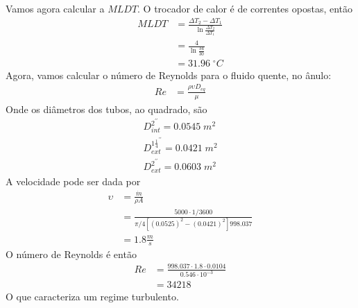 Vamos agora calcular a \(MLDT\). O trocador de calor é de correntes opostas, então
\begin{align}
    MLDT &= \frac{\Delta T_2 - \Delta T_1}{\ln \frac{\Delta T_2}{\Delta T_1}} \\  
    &= \frac{4}{\ln \frac{34}{30}}\\
    &= 31.96 \; ^{\circ}C
\end{align}
Agora, vamos calcular o número de Reynolds para o fluido quente, no ânulo:
\begin{align}
    Re &= \frac{\rho \upsilon D_{eq} }{\mu }
\end{align}
Onde os diâmetros dos tubos, ao quadrado, são
\begin{align}
    D_{int}^{2^{\prime\prime}} = 0.0545 \; m^{2} \\
    D_{ext}^{1 \frac{1}{4}^{\prime \prime}} = 0.0421 \; m^{2}\\
    D_{ext}^{2^{\prime\prime}} = 0.0603 \; m^{2}  
\end{align}
A velocidade pode ser dada por
\begin{align}
    \upsilon &= \frac{\dot{m}}{\rho A} \\
    &= \frac{5000 \cdot 1/3600}{\pi/4 \left[ \left( 0.0525 \right) ^{2} - \left( 0.0421 \right) ^{2}  \right] 998.037}\\
    &= 1.8 \frac{m}{s}
\end{align}
O número de Reynolds é então
\begin{align}
    Re &= \frac{998.037 \cdot 1.8 \cdot 0.0104}{0.546 \cdot 10^{-3}}\\
       & = 34218
\end{align}
O que caracteriza um regime turbulento. \par

